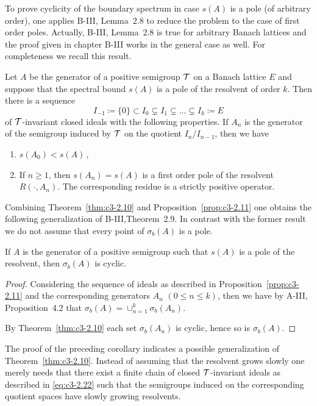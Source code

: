 To prove cyclicity of the boundary spectrum in case $s(A)$ is a pole (of arbitrary order), one applies B-III, Lemma~2.8 to reduce the problem to the case of first order poles. Actually, B-III, Lemma~2.8 is true for arbitrary Banach lattices and the proof given in chapter B-III works in the general case as well. For completeness we recall this result. 

\begin{proposition}\label{prop:c3-2.11}
	Let $A$ be the generator of a positive semigroup $\mathcal{T}$ on a Banach lattice $E$ and suppose that the spectral bound $s(A)$ is a pole of the resolvent of order $k$.
	Then there is a sequence
	\begin{equation}\label{eq:c3-2.22}
		I_{-1} \coloneqq \{0\} \subset I_{0} \subsetneq I_{1} \subsetneq ... \subsetneq I_{k} \coloneqq E
	\end{equation}
	of $\mathcal{T}$-invariant closed ideals with the following properties.
	If $A_{n}$ is the generator of the semigroup induced by $\mathcal{T}$ on the quotient $I_{n}/I_{n-1}$, then we have
	\begin{enumerate}[\upshape (i)]
		\item 	
		$s(A_{0}) < s(A)$\,,

		\item 
		If $n \geq 1$, then $s(A_{n}) = s(A)$ is a first order pole of the resolvent $R(\cdot,A_{n})$.
		The corresponding residue is a strictly positive operator.

	\end{enumerate}
\end{proposition}
Combining Theorem~\ref{thm:c3-2.10} and Proposition~\ref{prop:c3-2.11} one obtains the following generalization of B-III,Theorem~2.9.
In contrast with the former result we do not assume that every point of $\sigma_{b}(A)$ is a pole.
\begin{corollary}\label{cor:c3-2.12}
	If $A$ is the generator of a positive semigroup such that $s(A)$ is a pole of the resolvent, then $\sigma_{b}(A)$ is cyclic.
\end{corollary}
\begin{proof}
Considering the sequence of ideals as described in Proposition~\ref{prop:c3-2.11} and the corresponding generators $A_{n}$ $(0 \leq n \leq k)$, then we have by A-III, Proposition~4.2 that $\sigma_{b}(A) = \cup_{n=1}^{k} \sigma_{b}(A_{n})$.

By Theorem~\ref{thm:c3-2.10} each set $\sigma_{b}(A_{n})$ is cyclic, hence so is $\sigma_{b}(A)$.
\end{proof}
The proof of the preceding corollary indicates a possible generalization of Theorem~\ref{thm:c3-2.10}.
Instead of assuming that the resolvent grows slowly one merely needs that there exist a finite chain of closed $\mathcal{T}$-invariant ideals as described in \eqref{eq:c3-2.22} such that the semigroups induced on the corresponding quotient spaces have slowly growing resolvents.

